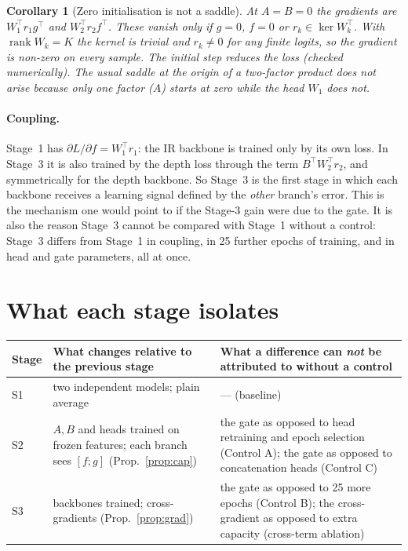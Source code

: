 \documentclass[11pt,a4paper]{article}
\theoremstyle{plain}
\newtheorem{cor}{Corollary}
\theoremstyle{remark}
\DeclareMathOperator{\rank}{rank}
\begin{document}
\begin{cor}[Zero initialisation is not a saddle]
At $A=B=0$ the gradients are $W_1^\top r_1g^\top$ and $W_2^\top r_2f^\top$. These vanish only if $g=0$, $f=0$ or $r_k\in\ker W_k^\top$. With $\rank W_k=K$ the kernel is trivial and $r_k\neq0$ for any finite logits, so the gradient is non-zero on every sample. The initial step reduces the loss (checked numerically). The usual saddle at the origin of a two-factor product does not arise because only one factor ($A$) starts at zero while the head $W_1$ does not.
\end{cor}

\paragraph{Coupling.} Stage~1 has $\partial L/\partial f=W_1^\top r_1$: the IR backbone is trained only by its own loss. In Stage~3 it is also trained by the depth loss through the term $B^\top W_2^\top r_2$, and symmetrically for the depth backbone. So Stage~3 is the first stage in which each backbone receives a learning signal defined by the \emph{other} branch's error. This is the mechanism one would point to if the Stage-3 gain were due to the gate. It is also the reason Stage~3 cannot be compared with Stage~1 without a control: Stage~3 differs from Stage~1 in coupling, in 25 further epochs of training, and in head and gate parameters, all at once.

\section{What each stage isolates}

\begin{center}\small
\renewcommand{\arraystretch}{1.15}\begin{tabular}{@{}p{1.2cm}>{\raggedright\arraybackslash}p{5.2cm}>{\raggedright\arraybackslash}p{7.2cm}@{}}\toprule
Stage & What changes relative to the previous stage & What a difference can \emph{not} be attributed to without a control\\\midrule
S1 & two independent models; plain average & --- (baseline)\\
S2 & $A,B$ and heads trained on frozen features; each branch sees $[f;g]$ (Prop.~\ref{prop:cap}) & the gate as opposed to head retraining and epoch selection (Control A); the gate as opposed to concatenation heads (Control C)\\
S3 & backbones trained; cross-gradients (Prop.~\ref{prop:grad}) & the gate as opposed to 25 more epochs (Control B); the cross-gradient as opposed to extra capacity (cross-term ablation)\\\bottomrule
\end{tabular}
\end{center}
\end{document}

